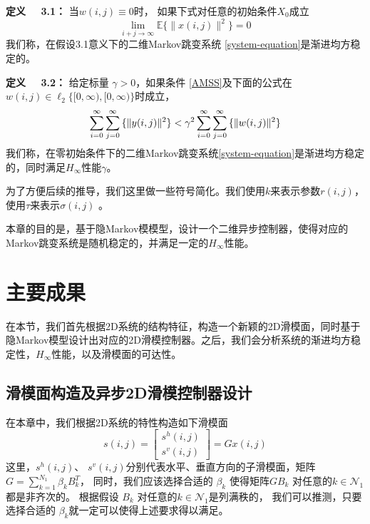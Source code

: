 	{\bf 定义 \ \ 3.1：}
	当$w(i,j)\equiv0$时， 如果下式对任意的初始条件$X_{0}$成立
	\begin{equation}\label{AMSS}
	\lim\limits_{i+j\to\infty}\mathbb{E}\{\|x(i,j)\|^{2}\} = 0
	\end{equation}
	我们称，在假设3.1意义下的二维Markov跳变系统 \eqref{system-equation}是渐进均方稳定的。
	
	{\bf 定义 \ \ 3.2：}
	给定标量 $\gamma>0$，如果条件 \eqref{AMSS}及下面的公式在$w(i,j)\in\ell_{2}\{[0,\infty),[0,\infty)\}$时成立，
	\begin{equation} \label{invDef2}
	\sum_{i=0}^{\infty}\sum_{j=0}^{\infty}\mathbb\{\|y(i,j)\|^{2}\} <  \gamma^{2} \sum_{i=0}^{\infty}\sum_{j=0}^{\infty}\mathbb\{\|w(i,j)\|^{2}\}
	\end{equation}
	我们称，在零初始条件下的二维Markov跳变系统\eqref{system-equation}是渐进均方稳定的，同时满足$H_{\infty}$性能$\gamma$。

	为了方便后续的推导，我们这里做一些符号简化。我们使用$k$来表示参数$r(i,j)$，使用$\tau$来表示$\sigma(i,j)$ 。

	本章的目的是，基于隐Markov模模型，设计一个二维异步控制器，使得对应的Markov跳变系统是随机稳定的，并满足一定的$H_{\infty}$性能。
	
\section{主要成果}
	在本节，我们首先根据2D系统的结构特征，构造一个新颖的2D滑模面，同时基于隐Markov模型设计出对应的2D滑模控制器。之后，我们会分析系统的渐进均方稳定性，$H_{\infty}$性能，以及滑模面的可达性。

\subsection{滑模面构造及异步2D滑模控制器设计} \label{sliding-surface}
	在本章中，我们根据2D系统的特性构造如下滑模面
	\begin{equation}\label{siding-surface-equation}	
	s(i,j) = \begin{bmatrix}
	s^{h}(i,j)\\
	s^{v}(i,j)
	\end{bmatrix}
	= Gx(i,j)
	\end{equation}
	这里，$s^{h}(i,j)$、 $s^{v}(i,j)$分别代表水平、垂直方向的子滑模面，矩阵$G=\sum_{k=1}^{N_{1}}\beta_{k}B^{T}_{k}$， 同时，我们应该选择合适的 $\beta_{k}$ 使得矩阵$GB_{k}$ 对任意的$k\in\mathcal{N}_{1}$都是非齐次的。 根据假设 $B_{k}$ 对任意的$k\in\mathcal{N}_{1}$是列满秩的， 我们可以推测，只要选择合适的 $\beta_{k}$就一定可以使得上述要求得以满足。 
	

